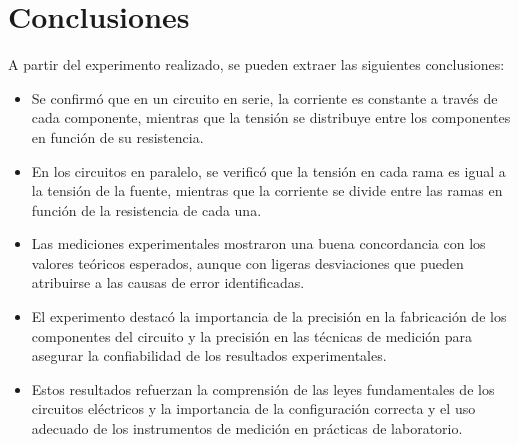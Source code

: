 \section{Conclusiones}
A partir del experimento realizado, se pueden extraer las siguientes conclusiones:
\begin{itemize}
    \item Se confirmó que en un circuito en serie, la corriente es constante a través de cada componente, mientras que la tensión se distribuye entre los componentes en función de su resistencia.
    \item En los circuitos en paralelo, se verificó que la tensión en cada rama es igual a la tensión de la fuente, mientras que la corriente se divide entre las ramas en función de la resistencia de cada una.
    \item Las mediciones experimentales mostraron una buena concordancia con los valores teóricos esperados, aunque con ligeras desviaciones que pueden atribuirse a las causas de error identificadas.
    \item El experimento destacó la importancia de la precisión en la fabricación de los componentes del circuito y la precisión en las técnicas de medición para asegurar la confiabilidad de los resultados experimentales.
    \item Estos resultados refuerzan la comprensión de las leyes fundamentales de los circuitos eléctricos y la importancia de la configuración correcta y el uso adecuado de los instrumentos de medición en prácticas de laboratorio.
\end{itemize}
